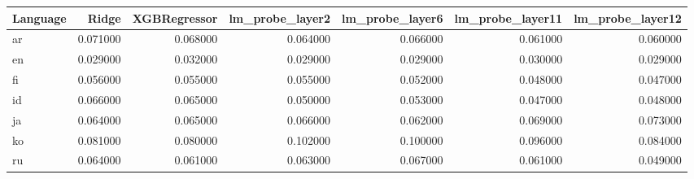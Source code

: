 \begin{tabular}{lrrrrrr}
\toprule
Language & Ridge & XGBRegressor & lm_probe_layer2 & lm_probe_layer6 & lm_probe_layer11 & lm_probe_layer12 \\
\midrule
ar & 0.071000 & 0.068000 & 0.064000 & 0.066000 & 0.061000 & 0.060000 \\
en & 0.029000 & 0.032000 & 0.029000 & 0.029000 & 0.030000 & 0.029000 \\
fi & 0.056000 & 0.055000 & 0.055000 & 0.052000 & 0.048000 & 0.047000 \\
id & 0.066000 & 0.065000 & 0.050000 & 0.053000 & 0.047000 & 0.048000 \\
ja & 0.064000 & 0.065000 & 0.066000 & 0.062000 & 0.069000 & 0.073000 \\
ko & 0.081000 & 0.080000 & 0.102000 & 0.100000 & 0.096000 & 0.084000 \\
ru & 0.064000 & 0.061000 & 0.063000 & 0.067000 & 0.061000 & 0.049000 \\
\bottomrule
\end{tabular}
